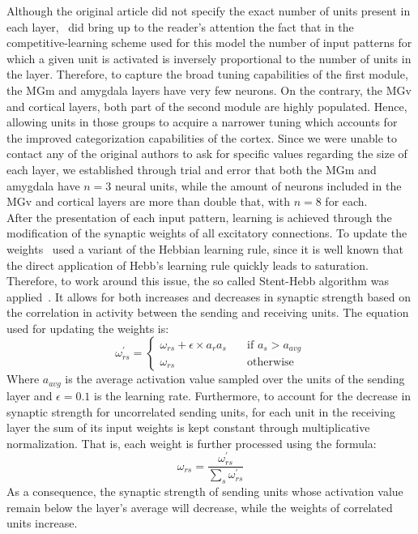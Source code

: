 Although the original article did not specify the exact number of units present in each layer,~\citet{Armony1995} did bring up to the reader's attention the fact that in the competitive-learning scheme used for this model the number of input patterns for which a given unit is activated is inversely proportional to the number of units in the layer. Therefore, to capture the broad tuning capabilities of the first module, the MGm and amygdala layers have very few neurons. On the contrary, the MGv and cortical layers, both part of the second module are highly populated. Hence, allowing units in those groups to acquire a narrower tuning which accounts for the improved categorization capabilities of the cortex. Since we were unable to contact any of the original authors to ask for specific values regarding the size of each layer, we established through trial and error that both the MGm and amygdala have $n = 3$ neural units, while the amount of neurons included in the MGv and cortical layers are more than double that, with $n=8$ for each.\\

After the presentation of each input pattern, learning is achieved through the modification of the synaptic weights of all excitatory connections. To update the weights~\citet{Armony1995} used a variant of the Hebbian learning rule, since it is well known that the direct application of Hebb's learning rule quickly leads to saturation. Therefore, to work around this issue, the so called Stent-Hebb algorithm was applied~\supercite{stent_physiological_1973}. It allows for both increases and decreases in synaptic strength based on the correlation in activity between the sending and receiving units. The equation used for updating the weights is:
\begin{equation}\label{equ:hebb1}
   \omega^{\prime}_{rs} = 
   \begin{cases}
      \omega_{rs} + \epsilon \times a_{r} a_{s} & \quad \text{if } a_{s} > a_{avg}\\
      \omega_{rs} & \quad \text{otherwise}
   \end{cases}
\end{equation}
Where $a_{avg}$ is the average activation value sampled over the units of the sending layer and $\epsilon = 0.1$ is the learning rate. Furthermore, to account for the decrease in synaptic strength for uncorrelated sending units, for each unit in the receiving layer the sum of its input weights is kept constant through multiplicative normalization. That is, each weight is further processed using the formula:
\begin{equation}\label{equ:normal}
   \omega_{rs} = \frac{\omega^{\prime}_{rs}}{\sum_{s} \omega^{\prime}_{rs}}
\end{equation}
As a consequence, the synaptic strength of sending units whose activation value remain below the layer's average will decrease, while the weights of correlated units increase.\\

